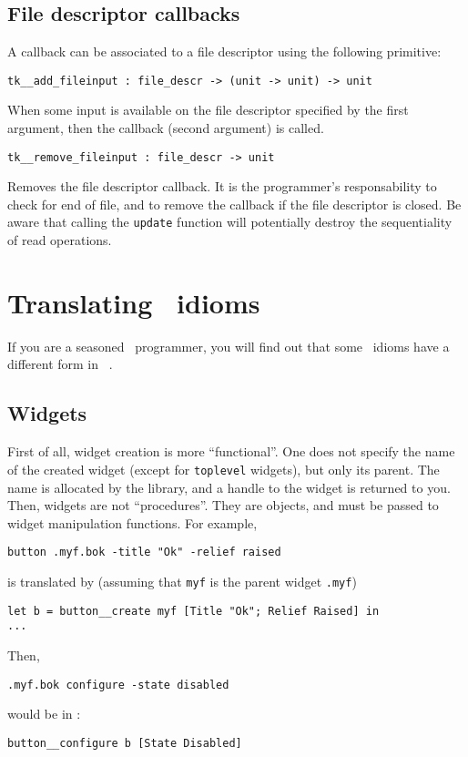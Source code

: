 \subsection{File descriptor callbacks}
A callback can be associated to a file descriptor using the following
primitive:
\begin{verbatim}
tk__add_fileinput : file_descr -> (unit -> unit) -> unit
\end{verbatim} 
When some input is available on the file descriptor specified by the first
argument, then the callback (second argument) is called.
\begin{verbatim}
tk__remove_fileinput : file_descr -> unit
\end{verbatim} 
Removes the file descriptor callback. It is the programmer's responsability
to check for end of file, and to remove the callback if the file descriptor
is closed. Be aware that calling the \verb|update| function will potentially
destroy the sequentiality of read operations.

\section{Translating \tk\ idioms}
If you are a seasoned \tk\ programmer, you will find out that some \tk\
idioms have a different form in \camltk\ .

\subsection{Widgets}
First of all, widget creation is more ``functional''. One does not specify
the name of the created widget (except for \verb|toplevel| widgets), but
only its parent. The name is allocated by the library, and a handle to the
widget is returned to you. Then, widgets are not ``procedures''. They are
objects, and must be passed to widget manipulation functions.
For example,
\begin{verbatim}
button .myf.bok -title "Ok" -relief raised
\end{verbatim} 
is translated by (assuming that \verb|myf| is the parent widget \verb|.myf|)
\begin{verbatim}
let b = button__create myf [Title "Ok"; Relief Raised] in
...
\end{verbatim} 
Then, 
\begin{verbatim}
.myf.bok configure -state disabled
\end{verbatim} 
would be in \caml:
\begin{verbatim}
button__configure b [State Disabled]
\end{verbatim} 

